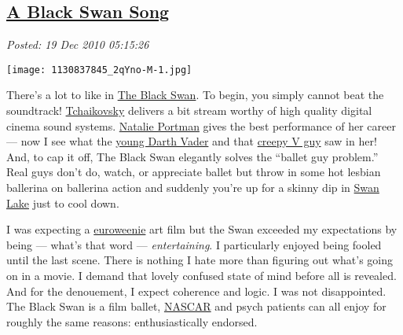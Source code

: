 %

\subsection*{\href{http://bakerjd99.wordpress.com/2010/12/19/a-black-swan-song/}{A Black Swan Song}}


\noindent\emph{Posted: 19 Dec 2010 05:15:26}
\vspace{6pt}

\captionsetup[floatingfigure]{labelformat=empty}
\begin{floatingfigure}[l]{0.23\textwidth}
\centering
\texttt{[image: 1130837845\_2qYno-M-1.jpg]}
\label{fig:985X0}
\end{floatingfigure}There's a lot to like in
\href{http://www.foxsearchlight.com/blackswan/}{The Black Swan}. To
begin, you simply cannot beat the soundtrack!
\href{http://www.classical.net/music/comp.lst/tchaikovsky.php}{Tchaikovsky}
delivers a bit stream worthy of high quality digital cinema sound
systems. \href{http://www.natalieportman.com/}{Natalie Portman} gives
the best performance of her career --- now I see what the
\href{http://www.starwars.com/databank/character/anakinskywalker/}{young
Darth Vader} and that
\href{http://www.rottentomatoes.com/m/v\_for\_vendetta/}{creepy V guy}
saw in her! And, to cap it off, The Black Swan elegantly solves the
``ballet guy problem.'' Real guys don't do, watch, or appreciate ballet
but throw in some hot lesbian ballerina on ballerina action and suddenly
you're up for a skinny dip in
\href{http://www.youtube.com/watch?v=3bYTomI-Uiw}{Swan Lake} just to
cool down.

I was expecting a
\href{http://www.urbandictionary.com/define.php?term=euroweenie}{euroweenie}
art film but the Swan exceeded my expectations by being --- what's that
word --- \emph{entertaining}. I particularly enjoyed being fooled until
the last scene. There is nothing I hate more than figuring out what's going
on in a movie. I demand that lovely confused state of mind before all is
revealed. And for the denouement, I expect coherence and logic. I was
not disappointed. The Black Swan is a film ballet,
\href{http://auto-racing.speedtv.com/article/alms-black-swan-confirms-porsche-gt-entry/}{NASCAR}
and psych patients can all enjoy for roughly the same reasons:
enthusiastically endorsed.




%